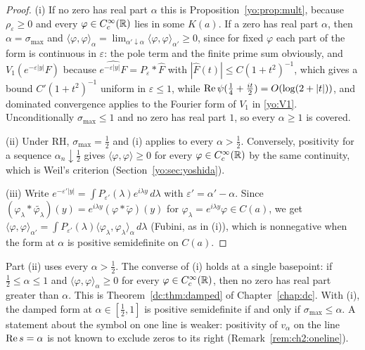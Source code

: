\begin{proof}
(i) If no zero has real part $\alpha$ this is Proposition~\ref{yo:prop:mult}, because $\rho_\varepsilon\ge0$ and every $\varphi\in C_c^\infty(\mathbb{R})$ lies in some $K(a)$. If a zero has real part $\alpha$, then $\alpha=\sigma_{\max}$ and $\langle\varphi,\varphi\rangle_\alpha=\lim_{\alpha'\downarrow\alpha}\langle\varphi,\varphi\rangle_{\alpha'}\ge0$, since for fixed $\varphi$ each part of the form is continuous in $\varepsilon$: the pole term and the finite prime sum obviously, and $V_1(e^{-\varepsilon|y|}F)$ because $\widehat{e^{-\varepsilon|y|}F}=P_\varepsilon*\widehat F$ with $|\widehat F(t)|\le C(1+t^2)^{-1}$, which gives a bound $C'(1+t^2)^{-1}$ uniform in $\varepsilon\le1$, while $\operatorname{Re}\psi(\frac14+\frac{it}2)=O(\log(2+|t|))$, and dominated convergence applies to the Fourier form of $V_1$ in \eqref{yo:V1}. Unconditionally $\sigma_{\max}\le1$ and no zero has real part $1$, so every $\alpha\ge1$ is covered.

(ii) Under RH, $\sigma_{\max}=\frac12$ and (i) applies to every $\alpha>\frac12$. Conversely, positivity for a sequence $\alpha_n\downarrow\frac12$ gives $\langle\varphi,\varphi\rangle\ge0$ for every $\varphi\in C_c^\infty(\mathbb{R})$ by the same continuity, which is Weil's criterion (Section~\ref{yo:sec:yoshida}).

(iii) Write $e^{-\varepsilon'|y|}=\int P_{\varepsilon'}(\lambda)e^{i\lambda y}\,d\lambda$ with $\varepsilon'=\alpha'-\alpha$. Since $(\varphi_\lambda*\widetilde{\varphi_\lambda})(y)=e^{i\lambda y}(\varphi*\widetilde\varphi)(y)$ for $\varphi_\lambda=e^{i\lambda y}\varphi\in C(a)$, we get $\langle\varphi,\varphi\rangle_{\alpha'}=\int P_{\varepsilon'}(\lambda)\langle\varphi_\lambda,\varphi_\lambda\rangle_\alpha\,d\lambda$ (Fubini, as in (i)), which is nonnegative when the form at $\alpha$ is positive semidefinite on $C(a)$.
\end{proof}

\begin{remark}\label{yo:rem:single}
Part (ii) uses every $\alpha>\frac12$. The converse of (i) holds at a single basepoint: if $\frac12\le\alpha\le1$ and $\langle\varphi,\varphi\rangle_\alpha\ge0$ for every $\varphi\in C_c^\infty(\mathbb{R})$, then no zero has real part greater than $\alpha$. This is Theorem~\ref{dc:thm:damped} of Chapter~\ref{chap:dc}. With (i), the damped form at $\alpha\in[\frac12,1]$ is positive semidefinite if and only if $\sigma_{\max}\le\alpha$. A statement about the symbol on one line is weaker: positivity of $v_\alpha$ on the line $\operatorname{Re} s=\alpha$ is not known to exclude zeros to its right (Remark~\ref{rem:ch2:oneline}).
\end{remark}

